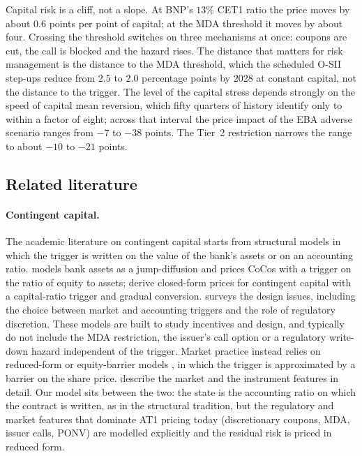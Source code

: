 Capital risk is a cliff, not a slope. At BNP's $13\%$ CET1 ratio the price moves by
about $0.6$ points per point of capital; at the MDA threshold it moves by about four.
Crossing the threshold switches on three mechanisms at once: coupons are cut, the call
is blocked and the hazard rises. The distance that matters for risk management is the
distance to the MDA threshold, which the scheduled O-SII step-ups reduce from $2.5$ to
$2.0$ percentage points by 2028 at constant capital, not the distance to the trigger.
The level of the capital stress depends strongly on the speed of capital mean
reversion, which fifty quarters of history identify only to within a factor of eight;
across that interval the price impact of the EBA adverse scenario ranges from $-7$ to
$-38$ points. The Tier~2 restriction narrows the range to about $-10$ to $-21$ points.

\subsection{Related literature}

\paragraph{Contingent capital.} The academic literature on contingent capital starts
from structural models in which the trigger is written on the value of the bank's
assets or on an accounting ratio. \citet{Pennacchi2010} models bank assets as a
jump-diffusion and prices CoCos with a trigger on the ratio of equity to assets;
\citet{GlassermanNouri2012} derive closed-form prices for contingent capital with a
capital-ratio trigger and gradual conversion. \citet{Flannery2014} surveys the design
issues, including the choice between market and accounting triggers and the role of
regulatory discretion. These models are built to study incentives and design, and
typically do not include the MDA restriction, the issuer's call option or a regulatory
write-down hazard independent of the trigger. Market practice instead relies on
reduced-form or equity-barrier models \citep{DeSpiegeleerSchoutens2012}, in which the
trigger is approximated by a barrier on the share price. \citet{AvdjievEtAl2013}
describe the market and the instrument features in detail. Our model sits between the
two: the state is the accounting ratio on which the contract is written, as in the
structural tradition, but the regulatory and market features that dominate AT1 pricing
today (discretionary coupons, MDA, issuer calls, PONV) are modelled explicitly and the
residual risk is priced in reduced form.

